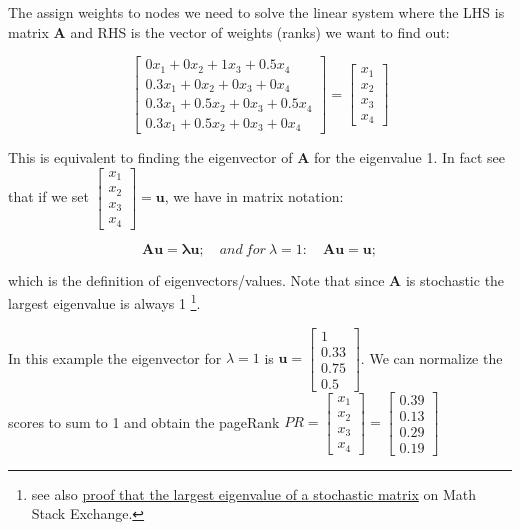 The assign weights to nodes we need to solve the linear system where the LHS is
matrix \textbf{A} and RHS is the vector of weights (ranks) we want to find out:

\begin{equation}
\left[\begin{matrix}
0 x_1 + 0 x_2 + 1 x_{3} + 0.5 x_{4} \\
0.3 x_{1}  + 0 x_2 + 0 x_3 + 0 x_4 \\
0.3 x_{1} + 0.5 x_{2} + 0 x_3 + 0.5 x_{4} \\
0.3 x_{1} + 0.5 x_{2} + 0 x_3 + 0 x_4
\end{matrix}\right] =
\left[\begin{matrix}x_{1}\\ x_{2}\\x_{3}\\x_{4}\end{matrix}\right]
\end{equation}

This is equivalent to finding the eigenvector of \textbf{A} for the eigenvalue 1.
In fact see that if we set $\left[\begin{matrix}x_{1}\\x_{2}\\x_{3}\\x_{4}\end{matrix}\right] = \mathbf{u}$,
we have in matrix notation:

\begin{equation}
\mathbf{Au = \lambda u}; \quad and\ for\ \lambda = 1: \quad \mathbf{Au = u}; 
\end{equation}

which is the definition of eigenvectors/values. Note that since \textbf{A} is
stochastic the largest eigenvalue is always 1 \footnote{see also
\href{http://math.stackexchange.com/questions/40320/proof-that-the-largest-eigenvalue-of-a-stochastic-matrix-is-1}
{proof that the largest eigenvalue of a stochastic matrix} on Math Stack Exchange.}.

In this example the eigenvector for $\lambda = 1$ is $\mathbf{u} = \left[\begin{matrix}1\\0.33\\0.75\\0.5\end{matrix}\right]$.
We can normalize the scores to sum to 1 and obtain the pageRank
$PR =
\left[\begin{matrix}x_{1}\\x_{2}\\x_{3}\\x_{4}\end{matrix}\right] =
\left[\begin{matrix}0.39\\0.13\\0.29\\0.19\end{matrix}\right]$

